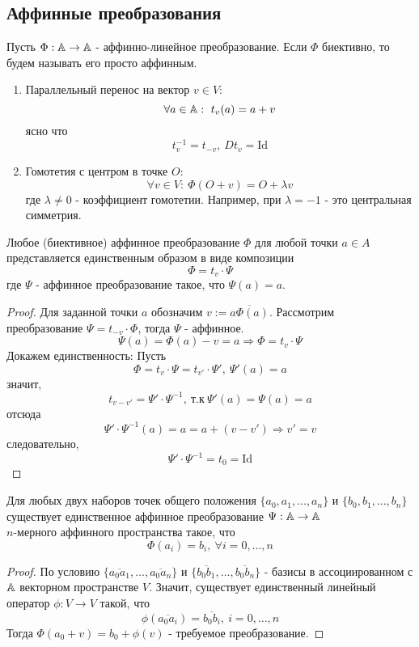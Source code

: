 \subsection*{Аффинные преобразования}
\begin{definition}
    Пусть $\Phi:\mathbb{A}\to \mathbb{A}$ - аффинно-линейное преобразование. Если $\Phi$ биективно, то будем называть его просто аффинным.
\end{definition} 
\begin{example}
    \begin{enumerate}
        \item Параллельный перенос на вектор $v\in V$:
        \[\forall a\in \mathbb{A}:\ t_v(a)=a+v\]
        ясно что 
        \[t^{-1}_v=t_{-v},\ Dt_v=\text{Id}\]
        \item Гомотетия с центром в точке $O$:
        \[\forall v\in V:\ \Phi(O+v)=O+\lambda v\]
        где $\lambda\ne 0$ - коэффициент гомотетии.
        Например, при $\lambda=-1$ - это центральная симметрия.
    \end{enumerate}
\end{example}
\begin{theorem}
    Любое (биективное) аффинное преобразование $\Phi$ для любой точки $a\in A$ представляется единственным образом в виде композиции 
    \[\Phi=t_v\cdot \Psi\]
    где $\Psi$ - аффинное преобразование такое, что $\Psi(a)=a$. 
\end{theorem} 
\begin{proof}
    Для заданной точки $a$ обозначим $v:=\overline{a\Phi(a)}$. Рассмотрим преобразование $\Psi = t_{-v}\cdot \Phi$, тогда $\Psi$ - аффинное.
    \[\Psi(a)=\Phi(a)-v=a \Longrightarrow \Phi=t_v\cdot \Psi\]
    Докажем единственность: Пусть 
    \[\Phi=t_v\cdot \Psi=t_{v'}\cdot \Psi',\ \Psi'(a)=a\]
    значит,
    \[t_{v-v'}=\Psi'\cdot\Psi^{-1},\ \text{т.к}\ \Psi'(a)=\Psi(a)=a\]
    отсюда
    \[\Psi'\cdot \Psi^{-1}(a)=a=a+(v-v') \Longrightarrow v'=v\]
    следовательно,
    \[\Psi'\cdot\Psi^{-1}=t_0=\text{Id}\]
\end{proof} 
\begin{theorem}
    Для любых двух наборов точек общего положения $\{a_0, a_1,\dots,a_n\}$ и $\{b_0,b_1,\dots,b_n\}$ существует единственное аффинное преобразование $\Psi: \mathbb{A}\to \mathbb{A}$\\
    $n$-мерного аффинного пространства такое, что
    \[\Phi(a_i)=b_i,\ \forall i=0,\dots,n\]
\end{theorem} 
\begin{proof}
    По условию $\{\overline{a_0a_1},\dots,\overline{a_0a_n}\}$ и $\{\overline{b_0b_1},\dots,\overline{b_0b_n}\}$ - базисы в ассоциированном с $\mathbb{A}$ векторном пространстве $V$. Значит, существует единственный линейный оператор $\phi: V\to V$ такой, что
    \[\phi(\overline{a_0a_i})=\overline{b_0b_i},\ i=0,\dots, n\]
    Тогда $\Phi(a_0+v)=b_0+\phi(v)$ - требуемое преобразование.
\end{proof} 
